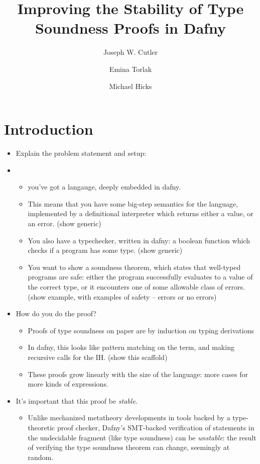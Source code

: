 \documentclass[sigplan,review,screen,anonymous]{acmart}
\author{Joseph W. Cutler}
\affiliation{%
  \institution{University of Pennsylvania}
  \city{Philadelphia}
  \state{Pennsylvania}
  \country{USA}
}
\author{Emina Torlak}
\affiliation{%
  \institution{Amazon Web Services}
  \city{Seattle}
  \state{Washington}
  \country{USA}
}
\author{Michael Hicks}
\affiliation{%
  \institution{Amazon Web Services}
  \city{Arlington}
  \state{Virginia}
  \country{USA}
}
\title{Improving the Stability of Type Soundness Proofs in Dafny}
\begin{document}
\maketitle

\section{Introduction}

\begin{itemize}
    \item Explain the problem statement and setup:
    \item \begin{itemize}
      \item you've got a langauge, deeply embedded in dafny.
      \item This means that you have some big-step semantics for the language, implemented by a definitional interpreter which returns either a value, or an error. (show generic)
      \item You also have a typechecker, written in dafny: a boolean function which checks if a program has some type.  (show generic)
      \item You want to show a soundness theorem, which states that well-typed programs are safe: either the program successfully evaluates to a value of the correct type, or it encounters one of some allowable class of errors. (show example, with examples of safety -- errors or no errors)
    \end{itemize}

    \item How do you do the proof?
    \begin{itemize}
      \item Proofs of type soundness on paper are by induction on typing derivations
      \item In dafny, this looks like pattern matching on the term, and making recursive calls for the IH. (show this scaffold)
      \item These proofs grow linearly with the size of the language: more cases for more kinds of expressions.
    \end{itemize}

    \item It's important that this proof be \emph{stable}. 
    \begin{itemize}
      \item Unlike mechanized metatheory developments in tools backed by a type-theoretic proof checker, Dafny's SMT-backed verification
      of statements in the undecidable fragment (like type soundness) can be \emph{unstable}: the result of verifying the type soundness theorem
      can change, seemingly at random.


\end{itemize}
\end{itemize}
\end{document}
